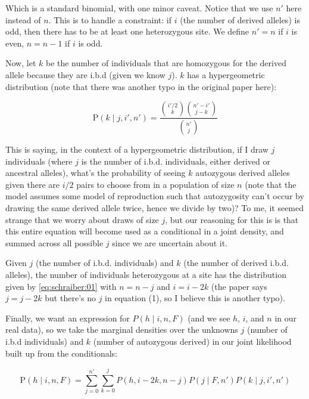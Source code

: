 \documentclass[12pt]{article}\usepackage[]{graphicx}\usepackage[]{color}
\begin{document}
Which is a standard binomial, with one minor caveat. Notice that we
use $n'$ here instead of $n$. This is to handle a constraint: if $i$
(the number of derived alleles) is odd, then there has to be at least
one heterozygous site. We define $n' = n$ if $i$ is even, $n = n - 1$
if $i$ is odd.

Now, let $k$ be the number of individuals that are homozygous for the
derived allele because they are i.b.d (given we know $j$). $k$ has a
hypergeometric distribution (note that there was another typo in the
original paper here):

\begin{equation} \label{eq:schraiber:03}
\text{P}(k \mid j, i', n') = \frac{  {i'/2 \choose k} { n' - i' \choose j - k } } { {n' \choose j}}
\end{equation}

This is saying, in the context of a hypergeometric distribution, if I
draw $j$ individuals (where $j$ is the number of i.b.d. individuals,
either derived or ancestral alleles), what's the probability of seeing
$k$ autozygous derived alleles given there are $i/2$ pairs to choose
from in a population of size $n$ (note that the model assumes some
model of reproduction such that autozygosity can't occur by drawing
the same derived allele twice, hence we divide by two)? To me, it
seemed strange that we worry about draws of size $j$, but our
reasoning for this is is that this entire equation will become used as
a conditional in a joint density, and summed across all possible $j$
since we are uncertain about it.

Given $j$ (the number of i.b.d. individuals) and $k$ (the number of
derived i.b.d. alleles), the number of individuals heterozygous at a
site has the distribution given by \autoref{eq:schraiber:01} with $n =
n - j$ and $i = i - 2k$ (the paper says $j = j - 2k$ but there's no
$j$ in equation (1), so I believe this is another typo). 

Finally, we want an expression for $P(h \mid i, n, F)$ (and we see
$h$, $i$, and $n$ in our real data), so we take the marginal densities
over the unknowns $j$ (number of i.b.d individuals) and $k$ (number of
autozygous derived) in our joint likelihood built up from the
conditionals:

\begin{equation} \label{eq:schraiber:04}
\text{P}(h \mid i, n, F) = \sum_{j=0}^{n'}\sum_{k=0}^{j} P(h, i - 2k, n - j) P(j \mid F, n') P(k \mid j, i', n')
\end{equation}
\end{document}
